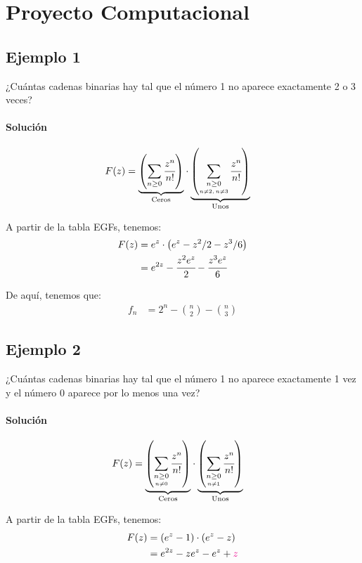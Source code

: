 \section*{Proyecto Computacional}

\subsection*{Ejemplo 1}
¿Cuántas cadenas binarias hay tal que el número 1 no aparece exactamente 2 o 3 veces?

\paragraph{Solución}

\begin{align*}
F(z)&=\underset{\text{Ceros}}{\underbrace{\left(\sum_{n\geq0}{\cfrac{z^{n}}{n!}}\right)}}\cdot \underset{\text{Unos}}{\underbrace{\left(\sum_{\underset{n\not=2,\,n\not=3}{n\geq0}}{\cfrac{z^{n}}{n!}}\right)}}
\end{align*}

A partir de la tabla EGFs, tenemos:
\begin{align*}
F(z)&=e^z\cdot\left(e^z-z^2/2-z^3/6\right)\\
&=e^{2z}-\cfrac{z^2e^z}{2}-\cfrac{z^3e^z}{6}
\end{align*}

De aquí, tenemos que:
\begin{align*}
f_n&=2^n-\binom{n}{2}-\binom{n}{3}
\end{align*}


\subsection*{Ejemplo 2}
¿Cuántas cadenas binarias hay tal que el número 1 no aparece exactamente 1 vez y el número 0 aparece por lo menos una vez?

\paragraph{Solución}

\begin{align*}
F(z)&=\underset{\text{Ceros}}{\underbrace{\left(\sum_{\underset{n\not=0}{n\geq0}}{\cfrac{z^{n}}{n!}}\right)}}\cdot \underset{\text{Unos}}{\underbrace{\left(\sum_{\underset{n\not=1}{n\geq0}}{\cfrac{z^{n}}{n!}}\right)}}
\end{align*}

A partir de la tabla EGFs, tenemos:
\begin{align*}
F(z)&=\left(e^z-1\right)\cdot\left(e^z-z\right)\\
&=e^{2z}-ze^{z}-e^z+{\color{magenta}z}
\end{align*}

